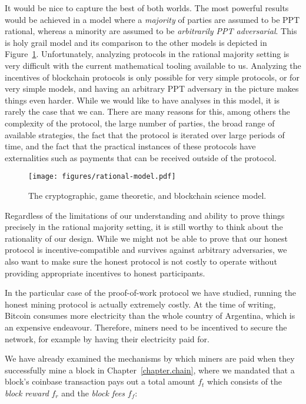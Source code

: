 It would be nice to capture the best of both worlds. The most powerful
results would be achieved in a model where a \emph{majority} of parties
are assumed to be PPT rational, whereas a minority are assumed to be
\emph{arbitrarily PPT adversarial}. This is holy grail model and its
comparison to the other models is depicted in Figure~\ref{fig.rationality}.
Unfortunately, analyzing protocols in the rational majority setting
is very difficult with the current mathematical tooling available to us.
Analyzing the incentives of blockchain protocols is only possible for
very simple protocols, or for very simple models, and having an arbitrary
PPT adversary in the picture makes things even harder. While we would
like to have analyses in this model, it is rarely the case that we can.
There are many reasons for this, among others the complexity of the protocol,
the large number of parties, the broad range of available strategies,
the fact that the protocol is iterated over large periods of time,
and the fact that the practical instances of these protocols have externalities
such as payments that can be received outside of the protocol.

\begin{figure}[h]
  \centering
  \texttt{[image: figures/rational-model.pdf]}
  \caption{The cryptographic, game theoretic, and blockchain science model.}
  \label{fig.rationality}
\end{figure}

Regardless of the limitations of our understanding and ability to prove
things precisely in the rational majority setting, it is still worthy
to think about the rationality of our design. While we might not be able
to prove that our honest protocol is incentive-compatible and survives against
arbitrary adversaries, we also want to make sure the honest protocol is
not costly to operate without providing appropriate incentives to honest
participants.

In the particular case of the proof-of-work protocol we have studied,
running the honest mining protocol is actually extremely costly. At the time of
writing, Bitcoin consumes more electricity than the whole country of Argentina,
which is an expensive endeavour. Therefore, miners need to be incentived to
secure the network, for example by having their electricity paid for.

We have already examined the mechanisms by which miners are paid when they
successfully mine a block in Chapter~\ref{chapter.chain}, where we mandated
that a block's coinbase transaction pays out a total amount $f_t$ which
consists of the \emph{block reward} $f_r$ and the \emph{block fees} $f_f$:

